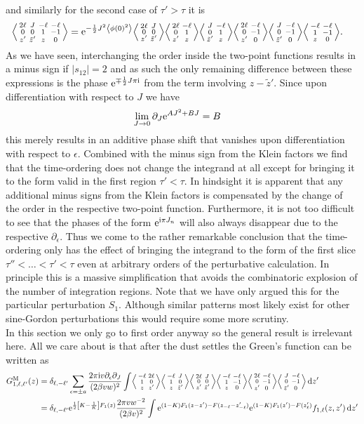 \documentclass[english, parskip=full]{scrartcl}
\begin{document}
and similarly for the second case of $\tau'>\tau$ it is
\begin{align}
\bra*{\abx{2\ell&J&-\ell&-\ell}{0&0&1&-1}{z'&\tilde{z}'&z&0}} &= \powe{-\frac{1}{2}J^2 \bra*{\phi(0)^2}} \bra*{\abx{2\ell&J}{0&0}{z'&\tilde{z}'}} \bra*{\abx{2\ell&-\ell}{0&1}{z'&z}} \bra*{\abx{J&-\ell}{0&1}{\tilde{z}'&z}} \bra*{\abx{2\ell&-\ell}{0&-1}{z'&0}} \bra*{\abx{J&-\ell}{0&-1}{\tilde{z}'&0}} \bra*{\abx{-\ell&-\ell}{1&-1}{z&0}}.
\end{align}
As we have seen, interchanging the order inside the two-point functions results in a minus sign if $|s_{12}|=2$ and as such the only remaining difference between these expressions is the phase $\text{e}^{\mp \frac{1}{2} J\pi\text{i}}$ from the term involving $z-\tilde{z}'$.
Since upon differentiation with respect to $J$ we have
\begin{align}
\lim_{J\rightarrow 0} \partial_J \text{e}^{AJ^2 + BJ} &= B
\end{align}
this merely results in an additive phase shift that vanishes upon differentiation with respect to $\epsilon$.
Combined with the minus sign from the Klein factors we find that the time-ordering does not change the integrand at all except for bringing it to the form valid in the first region $\tau'<\tau$.
In hindsight it is apparent that any additional minus signs from the Klein factors is compensated by the change of the order in the respective two-point function.
Furthermore, it is not too difficult to see that the phases of the form $\text{e}^{\text{i} \pi J_n}$ will also always disappear due to the respective $\partial_\epsilon$.
Thus we come to the rather remarkable conclusion that the time-ordering only has the effect of bringing the integrand to the form of the first slice $\tau''<\dots<\tau'<\tau$ even at arbitrary orders of the perturbative calculation.
In principle this is a massive simplification that avoids the combinatoric explosion of the number of integration regions.
Note that we have only argued this for the particular perturbation $S_1$.
Although similar patterns most likely exist for other sine-Gordon perturbations this would require some more scrutiny.\\
In this section we only go to first order anyway so the general result is irrelevant here.
All we care about is that after the dust settles the Green's function can be written as
\begin{align}
G_{1,\ell,\ell'}^\M(z) &= \delta_{\ell,-\ell'} \sum_{\epsilon=\pm a} \frac{2\pi\i v\partial_\epsilon \partial_J}{(2\beta v w)^2} \int \bra*{\abx{-\ell&2\ell}{1&0}{z&z'}} \bra*{\abx{-\ell&J}{1&0}{z&\tilde{z}'}} \bra*{\abx{2\ell&J}{0&0}{z'&\tilde{z}'}} \bra*{\abx{-\ell&-\ell}{1&-1}{z&0}} \bra*{\abx{2\ell&-\ell}{0&-1}{z'&0}} \bra*{\abx{J&-\ell}{0&-1}{\tilde{z}'&0}} \,\d z'\\
&= \delta_{\ell,-\ell'} \powe{\frac{1}{2} \klb*{K-\frac{1}{K}} F_1(z)} \frac{2\pi v w^{-2}}{(2\beta v)^2} \int \powe{(1-K) F_1(z-z') - F(z_{-\ell}-z'_{-\ell})} \powe{(1-K)F_1(z') - F(z_{\ell}')} f_{1,\ell}(z,z') \,\d z'
\end{align}
\end{document}
